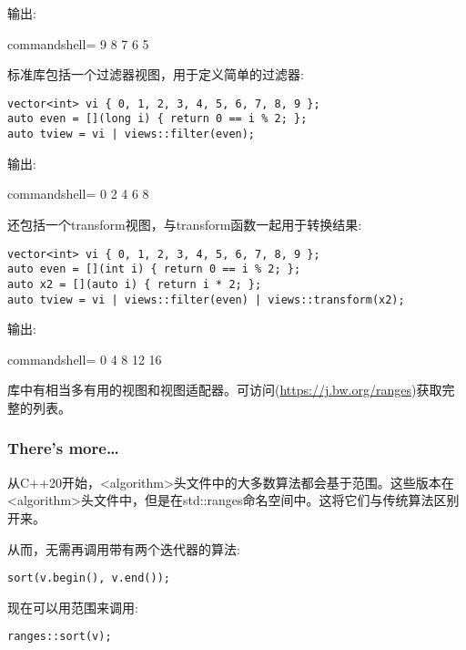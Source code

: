 输出:

\begin{tcblisting}{commandshell={}}
9 8 7 6 5
\end{tcblisting}

标准库包括一个过滤器视图，用于定义简单的过滤器:

\begin{lstlisting}[style=styleCXX]
vector<int> vi { 0, 1, 2, 3, 4, 5, 6, 7, 8, 9 };
auto even = [](long i) { return 0 == i % 2; };
auto tview = vi | views::filter(even);
\end{lstlisting}

输出:

\begin{tcblisting}{commandshell={}}
0 2 4 6 8
\end{tcblisting}

还包括一个transform视图，与transform函数一起用于转换结果:

\begin{lstlisting}[style=styleCXX]
vector<int> vi { 0, 1, 2, 3, 4, 5, 6, 7, 8, 9 };
auto even = [](int i) { return 0 == i % 2; };
auto x2 = [](auto i) { return i * 2; };
auto tview = vi | views::filter(even) | views::transform(x2);
\end{lstlisting}

输出:

\begin{tcblisting}{commandshell={}}
0 4 8 12 16
\end{tcblisting}

库中有相当多有用的视图和视图适配器。可访问(\url{https://j.bw.org/ranges})获取完整的列表。

\subsubsection{There's more…}

从C++20开始，<algorithm>头文件中的大多数算法都会基于范围。这些版本在<algorithm>头文件中，但是在std::ranges命名空间中。这将它们与传统算法区别开来。

从而，无需再调用带有两个迭代器的算法:

\begin{lstlisting}[style=styleCXX]
sort(v.begin(), v.end());
\end{lstlisting}

现在可以用范围来调用:

\begin{lstlisting}[style=styleCXX]
ranges::sort(v);
\end{lstlisting}

